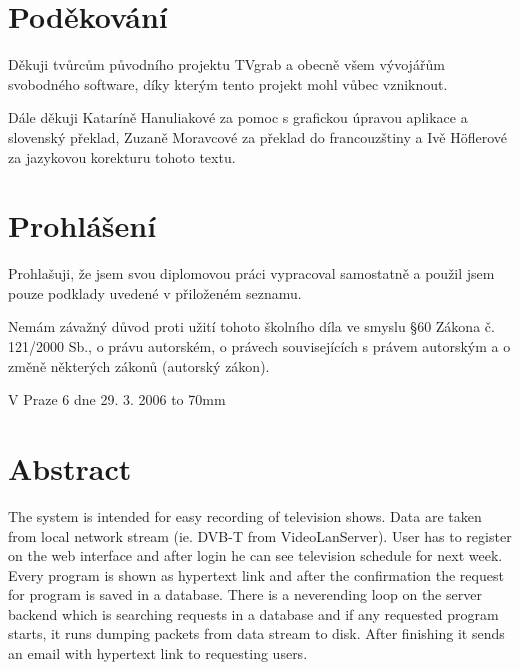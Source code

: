 \documentclass[11pt,twoside,a4paper]{dp_format}%
\begin{document}
\coverpagestarts
\vspace*{\fill}

\cleardoublepage %

\vspace*{\fill}
\chapter*{Poděkování}
Děkuji tvůrcům původního projektu TVgrab a obecně všem vývojářům svobodného software, díky kterým tento projekt mohl vůbec vzniknout.

Dále děkuji Kataríně Hanuliakové za pomoc s grafickou úpravou aplikace a slovenský překlad, Zuzaně Moravcové za překlad do francouzštiny a Ivě Höflerové za jazykovou korekturu tohoto textu.

\cleardoublepage %

\vspace*{\fill}
\chapter*{Prohlášení}
Prohlašuji, že jsem svou diplomovou práci vypracoval samostatně a použil jsem pouze podklady uvedené v přiloženém seznamu.

Nemám závažný důvod proti užití tohoto školního díla ve smyslu \S 60 Zákona č. 121/2000 Sb., o právu autorském, o právech souvisejících s právem autorským a o změně některých zákonů (autorský zákon).

V Praze 6 dne 29. 3. 2006  \hfill \hbox to 70mm{\tiny\dotfill}
 
\cleardoublepage%

\chapter*{Abstract}
The system is intended for easy recording of television shows. Data are taken from local network stream (ie. DVB-T from VideoLanServer). User has to register on the web interface and after login he can see television schedule for next week. Every program is shown as hypertext link and after the confirmation the request for program is saved in a database. There is a neverending loop on the server backend which is searching requests in a database and if any requested program starts, it runs dumping packets from data stream to disk. After finishing it sends an email with hypertext link to requesting users.
\end{document}
